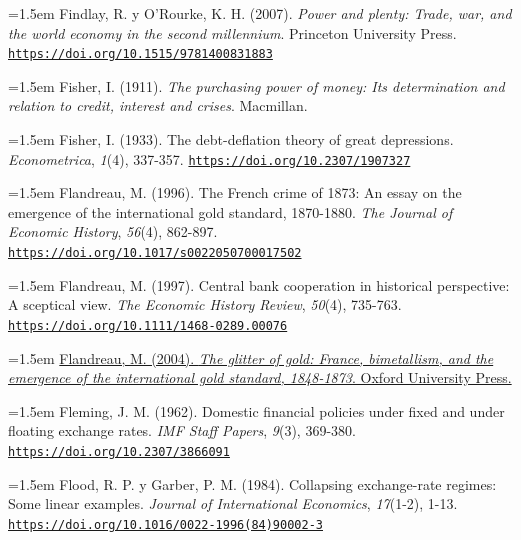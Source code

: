 \documentclass[10pt,a4paper]{article}
\begin{document}
{\sloppy\noindent\hangindent=1.5em Findlay, R. y O'Rourke, K. H. (2007). \textit{Power and plenty: Trade, war, and the world economy in the second millennium}. Princeton University Press. \href{https://doi.org/10.1515/9781400831883}{\nolinkurl{https://doi.org/10.1515/9781400831883}}\par}

\noindent\hangindent=1.5em Fisher, I. (1911). \textit{The purchasing power of money: Its determination and relation to credit, interest and crises}. Macmillan.

{\sloppy\noindent\hangindent=1.5em Fisher, I. (1933). The debt-deflation theory of great depressions. \textit{Econometrica}, \textit{1}(4), 337-357. \href{https://doi.org/10.2307/1907327}{\nolinkurl{https://doi.org/10.2307/1907327}}\par}

{\sloppy\noindent\hangindent=1.5em Flandreau, M. (1996). The French crime of 1873: An essay on the emergence of the international gold standard, 1870-1880. \textit{The Journal of Economic History}, \textit{56}(4), 862-897. \href{https://doi.org/10.1017/s0022050700017502}{\nolinkurl{https://doi.org/10.1017/s0022050700017502}}\par}

{\sloppy\noindent\hangindent=1.5em Flandreau, M. (1997). Central bank cooperation in historical perspective: A sceptical view. \textit{The Economic History Review}, \textit{50}(4), 735-763. \href{https://doi.org/10.1111/1468-0289.00076}{\nolinkurl{https://doi.org/10.1111/1468-0289.00076}}\par}

{\sloppy\noindent\hangindent=1.5em \href{https://econpapers.repec.org/RePEc:oxp:obooks:9780199257867}{Flandreau, M. (2004). \textit{The glitter of gold: France, bimetallism, and the emergence of the international gold standard, 1848-1873}. Oxford University Press.}\par}

{\sloppy\noindent\hangindent=1.5em Fleming, J. M. (1962). Domestic financial policies under fixed and under floating exchange rates. \textit{IMF Staff Papers}, \textit{9}(3), 369-380. \href{https://doi.org/10.2307/3866091}{\nolinkurl{https://doi.org/10.2307/3866091}}\par}

{\sloppy\noindent\hangindent=1.5em Flood, R. P. y Garber, P. M. (1984). Collapsing exchange-rate regimes: Some linear examples. \textit{Journal of International Economics}, \textit{17}(1-2), 1-13. \href{https://doi.org/10.1016/0022-1996(84)90002-3}{\nolinkurl{https://doi.org/10.1016/0022-1996(84)90002-3}}\par}
\end{document}
